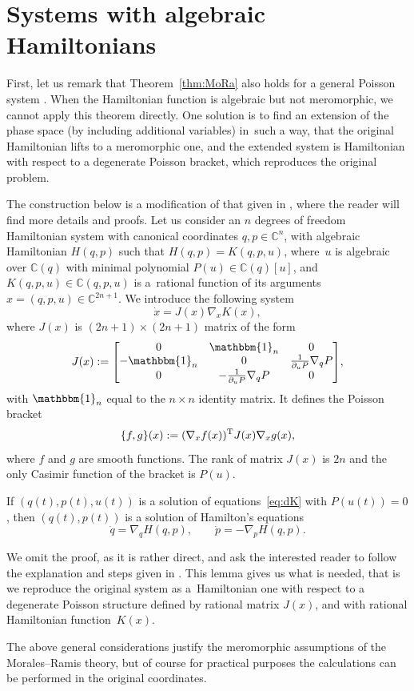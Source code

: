 \appendix

\section{Systems with algebraic Hamiltonians}\label{App0}

First, let us remark that Theorem~\ref{thm:MoRa} also holds for a
general Poisson system \cite{akn}. When the Hamiltonian function is algebraic but not meromorphic,
we cannot apply this theorem directly. One solution is to find an extension of the phase space (by including additional variables) in~such a way, that the original Hamiltonian lifts to a meromorphic one, and the extended system is Hamiltonian
with respect to a degenerate Poisson bracket, which reproduces
the original problem.

The construction below is a modification of that given in
\cite{alg}, where the reader will find more details and proofs. Let us
consider an $n$ degrees of freedom Hamiltonian system with canonical
coordinates $q,p\in\mathbb{C}^n$, with algebraic Hamiltonian $H(q,p)$
such that $H(q,p)=K(q,p,u)$, where~$u$ is algebraic over
$\mathbb{C}(q)$ with minimal polynomial $P(u)\in\mathbb{C}(q)[u]$, and
$K(q,p,u)\in \mathbb{C}(q,p,u)$ is a~rational function of its
arguments $x=(q,p,u)\in\mathbb{C}^{2n+1}$. We introduce the following
system
\begin{equation}
 \label{eq:dK}
 \dot x = J(x) \nabla_xK(x),
\end{equation}
where $J(x)$ is $(2n+1)\times(2n+1)$ matrix of the form
\begin{equation*}
 J(x):=\begin{bmatrix}
 0 & \mathbbm{1}_n & 0 \\
 -\mathbbm{1}_n & 0 & \frac{1}{\partial_u P}\nabla_q P \\
 0 & -\frac{1}{\partial_u P} \nabla_q P& 0
 \end{bmatrix}\!,
\end{equation*}
with $\mathbbm{1}_n$ equal to the $n\times n$ identity matrix. It defines the Poisson bracket
\begin{equation*}
 \{f,g\}(x) := (\nabla_xf(x))^{\rm T} J(x)\nabla_xg(x),
\end{equation*}
where $f$ and $g$ are smooth functions. The rank of matrix $J(x)$ is
$2n$ and the only Casimir function of the bracket is $P(u)$.
\begin{Lemma}
{\sloppy If $(q(t),p(t),u(t))$ is a solution of equations~\eqref{eq:dK} with
 $P(u(t))=0$, then $(q(t),p(t))$ is a solution of Hamilton's
 equations
 \begin{equation*}
 \dot q= \nabla_q H(q,p), \qquad
 \dot p=-\nabla_p H(q,p).
 \end{equation*}}
\end{Lemma}
We omit the proof, as it is rather direct, and ask the interested reader to follow the explanation and steps given in \cite[Section~2]{alg}. This lemma gives us what is needed, that is we reproduce the original system as a~Hamiltonian one with respect to a degenerate Poisson structure defined
by rational matrix $J(x)$, and with rational Hamiltonian function~$K(x)$.

The above general considerations justify the meromorphic assumptions
of the Morales--Ramis theory, but of course for practical purposes the
calculations can be performed in the original coordinates.
